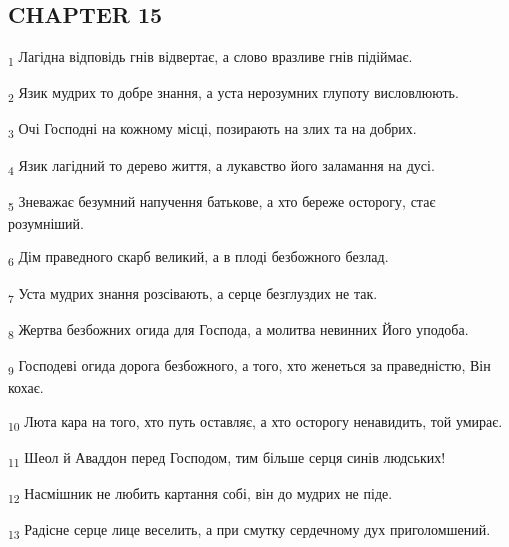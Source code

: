 \subsection{CHAPTER 15}
\begin{tcolorbox}
\textsubscript{1} Лагідна відповідь гнів відвертає, а слово вразливе гнів підіймає.
\end{tcolorbox}
\begin{tcolorbox}
\textsubscript{2} Язик мудрих то добре знання, а уста нерозумних глупоту висловлюють.
\end{tcolorbox}
\begin{tcolorbox}
\textsubscript{3} Очі Господні на кожному місці, позирають на злих та на добрих.
\end{tcolorbox}
\begin{tcolorbox}
\textsubscript{4} Язик лагідний то дерево життя, а лукавство його заламання на дусі.
\end{tcolorbox}
\begin{tcolorbox}
\textsubscript{5} Зневажає безумний напучення батькове, а хто береже осторогу, стає розумніший.
\end{tcolorbox}
\begin{tcolorbox}
\textsubscript{6} Дім праведного скарб великий, а в плоді безбожного безлад.
\end{tcolorbox}
\begin{tcolorbox}
\textsubscript{7} Уста мудрих знання розсівають, а серце безглуздих не так.
\end{tcolorbox}
\begin{tcolorbox}
\textsubscript{8} Жертва безбожних огида для Господа, а молитва невинних Його уподоба.
\end{tcolorbox}
\begin{tcolorbox}
\textsubscript{9} Господеві огида дорога безбожного, а того, хто женеться за праведністю, Він кохає.
\end{tcolorbox}
\begin{tcolorbox}
\textsubscript{10} Люта кара на того, хто путь оставляє, а хто осторогу ненавидить, той умирає.
\end{tcolorbox}
\begin{tcolorbox}
\textsubscript{11} Шеол й Аваддон перед Господом, тим більше серця синів людських!
\end{tcolorbox}
\begin{tcolorbox}
\textsubscript{12} Насмішник не любить картання собі, він до мудрих не піде.
\end{tcolorbox}
\begin{tcolorbox}
\textsubscript{13} Радісне серце лице веселить, а при смутку сердечному дух приголомшений.
\end{tcolorbox}
